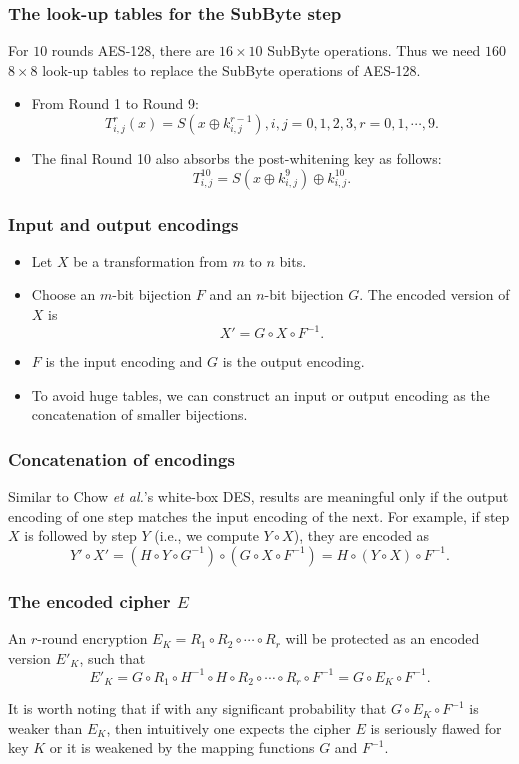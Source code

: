 \documentclass{beamer}
\begin{document}
\frame
{
\frametitle{The look-up tables for the SubByte step}
For $10$ rounds AES-128, there are $16\times 10$ SubByte operations. Thus we need $160$ $8\times 8$ look-up tables to replace the SubByte operations of AES-128.
\begin{itemize}
\item From Round 1 to Round 9:
\[T^{r}_{i,j}(x)=S(x\oplus k^{r-1}_{i,j}), i,j={0,1,2,3},r={0,1,\cdots, 9}.\]

\item The final Round 10 also absorbs the post-whitening key as follows:
    \[T^{10}_{i,j}=S(x\oplus k^{9}_{i,j})\oplus k^{10}_{i,j}.\]
\end{itemize}
}

\frame
{
\frametitle{Input and output encodings}
\begin{itemize}
\item Let $X$ be a transformation from $m$ to $n$ bits.
\item Choose an $m$-bit bijection $F$ and an $n$-bit bijection $G$. The encoded version of $X$ is
  \[X' = G \circ X \circ F^{-1}.\]
\item $F$ is \textcolor[rgb]{1.00,0.00,0.00}{the input encoding} and $G$ is \textcolor[rgb]{1.00,0.00,0.00}{the output encoding}.
\item To avoid huge tables, we can construct an input or output encoding as the concatenation of smaller bijections.
\end{itemize}
}

\frame
{
\frametitle{Concatenation of encodings}
Similar to Chow \textit{et al.}'s white-box DES, results are meaningful only if the output encoding of one step matches the input encoding of the next. For example, if step $X$ is followed by step $Y$ (i.e., we compute $Y \circ X$), they are encoded as
\[Y' \circ X' = (H \circ Y \circ G^{-1}) \circ (G \circ X \circ F^{-1}) = H \circ (Y \circ X) \circ F^{-1}.\]

}

\frame
{
\frametitle{The encoded cipher $E$}
An $r$-round encryption $E_{K}=R_{1}\circ R_{2} \circ \cdots \circ R_{r}$ will be protected as an encoded version $E'_{K}$, such that
\[E'_{K}= G \circ R_{1} \circ H^{-1} \circ H \circ R_{2} \circ \cdots \circ R_{r} \circ F^{-1}=G \circ E_{K} \circ F^{-1}.\]

It is worth noting that if with any significant probability that $G \circ E_{K} \circ F^{-1}$ is weaker than $E_{K}$, then intuitively one expects the cipher $E$ is seriously flawed for key $K$ or it is weakened by the mapping functions $G$ and $F^{-1}$.
}
\end{document}

